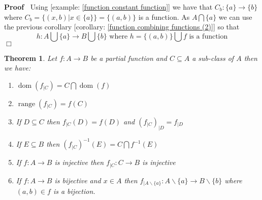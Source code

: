 \documentclass{book}
\newcommand{\tmop}[1]{\ensuremath{\operatorname{#1}}}
\newenvironment{proof}{\noindent\textbf{Proof\ }}{\hspace*{\fill}$\Box$\medskip}
\newtheorem{theorem}{Theorem}
\begin{document}
\begin{proof}
  Using [example: \ref{function constant function}] we have that $C_b : \{ a
  \} \rightarrow \{ b \}$ where $C_b = \{ (x, b) |x \in \{ a \} \} = \{ (a, b)
  \}$ is a function. As $A \bigcap \{ a \}$ we can use the previous corollary
  [corollary: \ref{function combining functions (2)}] so that
  \[ h : A \bigcup \{ a \} \rightarrow B \bigcup \{ b \} \text{ where } h =
     \{ (a, b) \} \bigcup f \text{ is a function} \]
\end{proof}

\begin{theorem}
  \label{function restricted function properties}Let $f : A \rightarrow B$ be
  a partial function and $C \subseteq A$ a sub-class of $A$ then we have:
  \begin{enumerate}
    \item $\tmop{dom} (f_{|C}) = C \bigcap \tmop{dom} (f)$
    
    \item $\tmop{range} (f_{|C}) = f (C)$
    
    \item If $D \subseteq C$ then $f_{|C} (D) = f (D)$ and $(f_{|C})_{|D} =
    f_{|D}$
    
    \item If $E \subseteq B$ then $(f_{|C})^{- 1} (E) = C \bigcap f^{- 1} (E)$
    
    \item If $f : A \rightarrow B$ is injective then $f_{|C} : C \rightarrow
    B$ is injective
    
    \item If $f : A \rightarrow B$ is bijective and $x \in A$ then
    $f_{|A\backslash \{ a \}} : A\backslash \{ a \} \rightarrow B\backslash \{
    b \}$ where $(a, b) \in f$ is a bijection.
  \end{enumerate}
\end{theorem}
\end{document}
